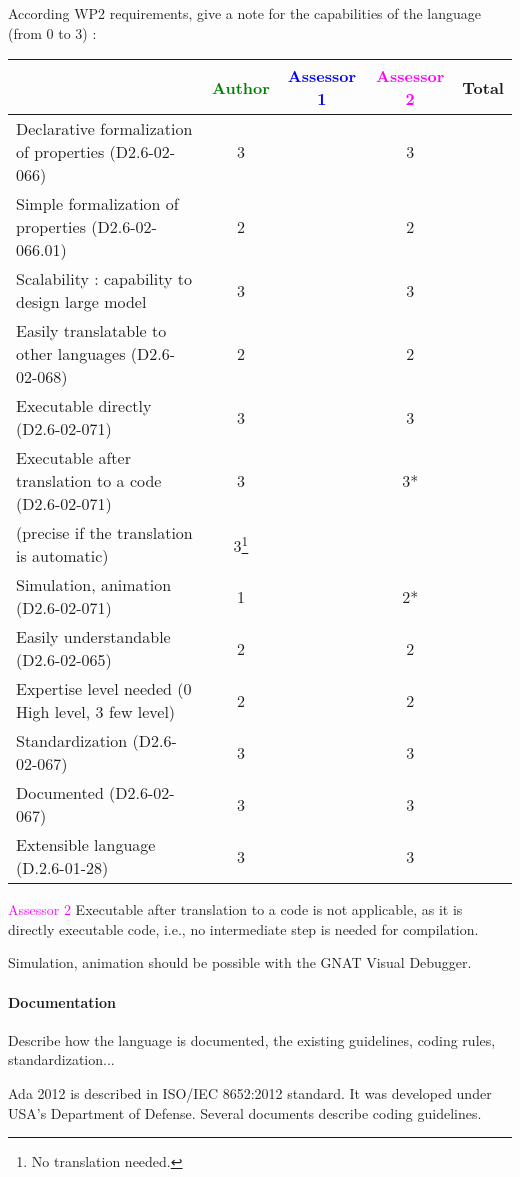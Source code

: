 According WP2 requirements, give a note for the capabilities of the language (from 0 to 3) :

\begin{tabular}{|l | c | c | c | c|}
\hline
& \textcolor{green}{Author} & \textcolor{blue}{Assessor 1} & \textcolor{magenta}{Assessor 2} & Total \\
\hline
Declarative formalization of properties (D2.6-02-066) & 3 & & 3 & \\
\hline
Simple formalization of properties (D2.6-02-066.01) & 2 & & 2 & \\
\hline
Scalability : capability to design large model & 3 & & 3 & \\
\hline
Easily translatable to other languages (D2.6-02-068) & 2 & & 2 & \\
\hline
Executable directly (D2.6-02-071) & 3 & & 3 & \\
\hline
Executable after translation to a code (D2.6-02-071) & 3 & & 3* & \\
(precise if the translation is automatic) & 3\footnote{No translation needed.} & & & \\
\hline
Simulation, animation (D2.6-02-071) & 1 & & 2* & \\
\hline
Easily understandable (D2.6-02-065) & 2 & & 2 & \\
\hline
Expertise level needed (0 High level, 3 few level) & 2 & & 2 & \\
\hline
Standardization (D2.6-02-067) & 3 & & 3 & \\
\hline
Documented (D2.6-02-067) & 3 & & 3 & \\
\hline
Extensible language (D.2.6-01-28) & 3 & & 3 & \\
\hline
\end{tabular}

\textcolor{magenta}{Assessor 2} Executable after translation to a code is not
applicable, as it is directly executable code, i.e., no intermediate step is
needed for compilation.

Simulation, animation should be possible with the GNAT Visual Debugger.


\paragraph{Documentation} Describe how the language is documented, the existing guidelines, coding rules, standardization...

Ada 2012 is described in ISO/IEC 8652:2012 standard. It was developed
under USA's Department of Defense. Several documents describe coding
guidelines.


